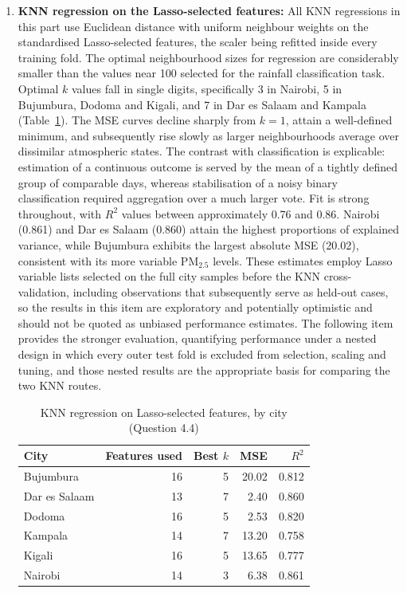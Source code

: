 \documentclass[conference]{IEEEtran}
\begin{document}
\begin{enumerate}
    \item \textbf{KNN regression on the Lasso-selected features:} All KNN regressions in this part use Euclidean distance with uniform neighbour weights on the standardised Lasso-selected features, the scaler being refitted inside every training fold. The optimal neighbourhood sizes for regression are considerably smaller than the values near 100 selected for the rainfall classification task. Optimal $k$ values fall in single digits, specifically 3 in Nairobi, 5 in Bujumbura, Dodoma and Kigali, and 7 in Dar es Salaam and Kampala (Table~\ref{tab:knnreg}). The MSE curves decline sharply from $k = 1$, attain a well-defined minimum, and subsequently rise slowly as larger neighbourhoods average over dissimilar atmospheric states. The contrast with classification is explicable: estimation of a continuous outcome is served by the mean of a tightly defined group of comparable days, whereas stabilisation of a noisy binary classification required aggregation over a much larger vote. Fit is strong throughout, with $R^2$ values between approximately 0.76 and 0.86. Nairobi (0.861) and Dar es Salaam (0.860) attain the highest proportions of explained variance, while Bujumbura exhibits the largest absolute MSE (20.02), consistent with its more variable PM$_{2.5}$ levels. These estimates employ Lasso variable lists selected on the full city samples before the KNN cross-validation, including observations that subsequently serve as held-out cases, so the results in this item are exploratory and potentially optimistic and should not be quoted as unbiased performance estimates. The following item provides the stronger evaluation, quantifying performance under a nested design in which every outer test fold is excluded from selection, scaling and tuning, and those nested results are the appropriate basis for comparing the two KNN routes.

    \begin{table}[h!]
        \centering
        \footnotesize
        \begin{tabular}{lrrrr}
            \toprule
            City & Features used & Best $k$ & MSE & $R^2$ \\
            \midrule
            Bujumbura & 16 & 5 & 20.02 & 0.812 \\
            Dar es Salaam & 13 & 7 & 2.40 & 0.860 \\
            Dodoma & 16 & 5 & 2.53 & 0.820 \\
            Kampala & 14 & 7 & 13.20 & 0.758 \\
            Kigali & 16 & 5 & 13.65 & 0.777 \\
            Nairobi & 14 & 3 & 6.38 & 0.861 \\
            \bottomrule
        \end{tabular}
        \caption{KNN regression on Lasso-selected features, by city (Question 4.4)}
        \label{tab:knnreg}
    \end{table}


\end{enumerate}
\end{document}
